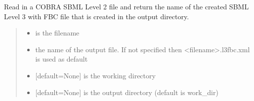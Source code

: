 \documentclass[letterpaper,12pt,english]{sphinxmanual}
\begin{document}
\begin{fulllineitems}
\label{\detokenize{api/io:cbmpy.CBXML.sbml_convertCOBRASBMLtoFBC}}
\pysigstartsignatures
\pysiglinewithargsret
{}
{\sphinxparamcomma {}\sphinxparamcomma {}\sphinxparamcomma {}}
{}
\pysigstopsignatures
\sphinxAtStartPar
Read in a COBRA SBML Level 2 file and return the name of the created SBML Level 3 with FBC file that is created in the output directory.
\begin{quote}\begin{description}
\begin{itemize}
\item {} 
\sphinxAtStartPar
{} \textendash{} is the filename

\item {} 
\sphinxAtStartPar
{} \textendash{} the name of the output file. If not specified then \textless{}filename\textgreater{}.l3fbc.xml is used as default

\item {} 
\sphinxAtStartPar
{} \textendash{} {[}default=None{]} is the working directory

\item {} 
\sphinxAtStartPar
{} \textendash{} {[}default=None{]} is the output directory (default is work\_dir)

\end{itemize}

\end{description}\end{quote}

\end{fulllineitems}

\end{document}
